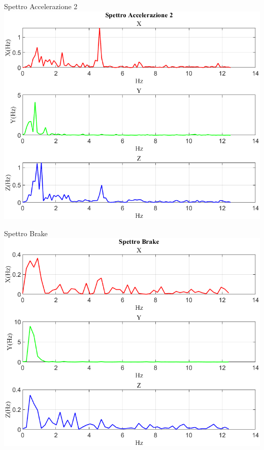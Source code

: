 \documentclass[beamer]{standalone}
\begin{document}
	\begin{frame}{{Spettro Accelerazione 2}}
		\centering\includegraphics[height=.8\textheight]{figure/Mag/Trasformata/Spettro Accelerazione 2}
	\end{frame}
	
	\begin{frame}{{Spettro Brake}}
		\centering\includegraphics[height=.8\textheight]{figure/Mag/Trasformata/Spettro Brake}
	\end{frame}
	
\end{document}
